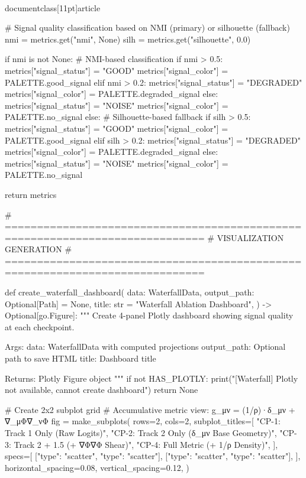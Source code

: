 \\documentclass[11pt]{article}
\begin{document}
\begin{CodeBlock}
    # Signal quality classification based on NMI (primary) or silhouette (fallback)
    nmi = metrics.get("nmi", None)
    silh = metrics.get("silhouette", 0.0)

    if nmi is not None:
        # NMI-based classification
        if nmi > 0.5:
            metrics["signal_status"] = "GOOD"
            metrics["signal_color"] = PALETTE.good_signal
        elif nmi > 0.2:
            metrics["signal_status"] = "DEGRADED"
            metrics["signal_color"] = PALETTE.degraded_signal
        else:
            metrics["signal_status"] = "NOISE"
            metrics["signal_color"] = PALETTE.no_signal
    else:
        # Silhouette-based fallback
        if silh > 0.5:
            metrics["signal_status"] = "GOOD"
            metrics["signal_color"] = PALETTE.good_signal
        elif silh > 0.2:
            metrics["signal_status"] = "DEGRADED"
            metrics["signal_color"] = PALETTE.degraded_signal
        else:
            metrics["signal_status"] = "NOISE"
            metrics["signal_color"] = PALETTE.no_signal

    return metrics


# =============================================================================
# VISUALIZATION GENERATION
# =============================================================================

def create_waterfall_dashboard(
    data: WaterfallData,
    output_path: Optional[Path] = None,
    title: str = "Waterfall Ablation Dashboard",
) -> Optional[go.Figure]:
    """
    Create 4-panel Plotly dashboard showing signal quality at each checkpoint.

    Args:
        data: WaterfallData with computed projections
        output_path: Optional path to save HTML
        title: Dashboard title

    Returns:
        Plotly Figure object
    """
    if not HAS_PLOTLY:
        print("[Waterfall] Plotly not available, cannot create dashboard")
        return None

    # Create 2x2 subplot grid
    # Accumulative metric view: g_μν = (1/ρ)·δ_μν + ∇_μΦ∇_νΦ
    fig = make_subplots(
        rows=2, cols=2,
        subplot_titles=[
            "CP-1: Track 1 Only (Raw Logits)",
            "CP-2: Track 2 Only (δ_μν Base Geometry)",
            "CP-3: Track 2 + 1.5 (+ ∇Φ∇Φ Shear)",
            "CP-4: Full Metric (+ 1/ρ Density)",
        ],
        specs=[
            [{"type": "scatter"}, {"type": "scatter"}],
            [{"type": "scatter"}, {"type": "scatter"}],
        ],
        horizontal_spacing=0.08,
        vertical_spacing=0.12,
    )


\end{CodeBlock}
\end{document}
